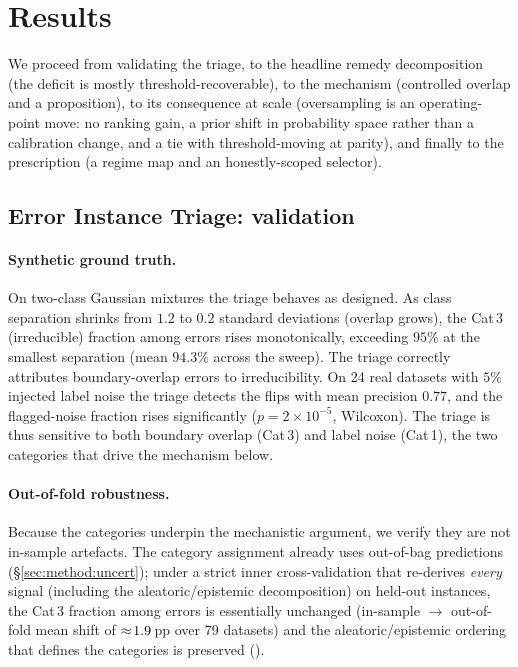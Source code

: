 \section{Results}\label{sec:results}

We proceed from validating the triage, to the headline remedy decomposition (the
deficit is mostly threshold-recoverable), to the mechanism (controlled overlap and
a proposition), to its consequence at scale (oversampling is an operating-point
move: no ranking gain, a prior shift in probability space rather than a
calibration change, and a tie with threshold-moving at parity), and finally to
the prescription (a regime map and an honestly-scoped
selector).

\subsection{Error Instance Triage: validation}\label{sec:results:validation}

\paragraph{Synthetic ground truth.} On two-class Gaussian mixtures the triage
behaves as designed. As class separation shrinks from $1.2$ to $0.2$ standard
deviations (overlap grows), the Cat\,3 (irreducible) fraction among errors rises
monotonically, exceeding $95\%$ at the smallest separation (mean $94.3\%$ across
the sweep). The triage correctly attributes boundary-overlap errors to
irreducibility. On 24 real datasets with $5\%$ injected label noise the triage
detects the flips with mean precision $0.77$, and the flagged-noise fraction rises
significantly ($p=2\times10^{-5}$, Wilcoxon). The triage is thus sensitive to both
boundary overlap (Cat\,3) and label noise (Cat\,1), the two categories that drive
the mechanism below.

\paragraph{Out-of-fold robustness.} Because the categories underpin the mechanistic
argument, we verify they are not in-sample artefacts. The category assignment
already uses out-of-bag predictions (\S\ref{sec:method:uncert}); under a strict
inner cross-validation that re-derives \emph{every} signal (including the
aleatoric/epistemic decomposition) on held-out instances, the Cat\,3 fraction
among errors is essentially unchanged (in-sample $\to$ out-of-fold mean shift of
$\approx\!1.9$\,pp over 79 datasets) and the aleatoric/epistemic ordering
that defines the categories is preserved ().

